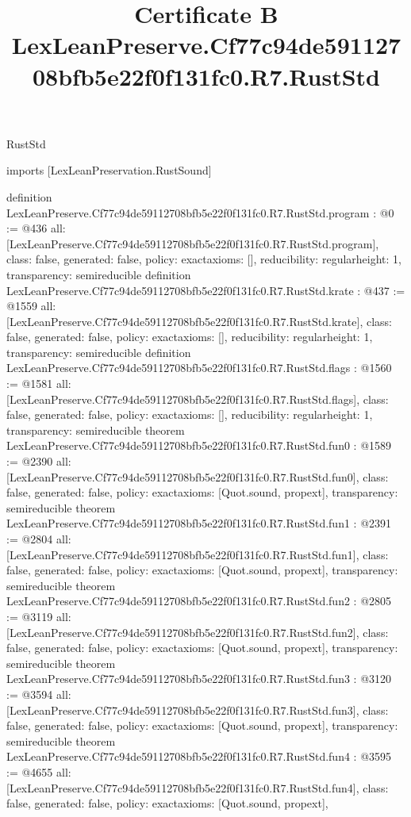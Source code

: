\begin{lexlean}{RustStd}
\title{Certificate B LexLeanPreserve.Cf77c94de59112708bfb5e22f0f131fc0.R7.RustStd}
\begin{coremodule}
imports [LexLeanPreservation.RustSound]

definition LexLeanPreserve.Cf77c94de59112708bfb5e22f0f131fc0.R7.RustStd.program : @0 := @436 {
  all: [LexLeanPreserve.Cf77c94de59112708bfb5e22f0f131fc0.R7.RustStd.program],
  class: false,
  generated: false,
  policy: exact{axioms: []},
  reducibility: regular{height: 1},
  transparency: semireducible
}
definition LexLeanPreserve.Cf77c94de59112708bfb5e22f0f131fc0.R7.RustStd.krate : @437 := @1559 {
  all: [LexLeanPreserve.Cf77c94de59112708bfb5e22f0f131fc0.R7.RustStd.krate],
  class: false,
  generated: false,
  policy: exact{axioms: []},
  reducibility: regular{height: 1},
  transparency: semireducible
}
definition LexLeanPreserve.Cf77c94de59112708bfb5e22f0f131fc0.R7.RustStd.flags : @1560 := @1581 {
  all: [LexLeanPreserve.Cf77c94de59112708bfb5e22f0f131fc0.R7.RustStd.flags],
  class: false,
  generated: false,
  policy: exact{axioms: []},
  reducibility: regular{height: 1},
  transparency: semireducible
}
theorem LexLeanPreserve.Cf77c94de59112708bfb5e22f0f131fc0.R7.RustStd.fun0 : @1589 := @2390 {
  all: [LexLeanPreserve.Cf77c94de59112708bfb5e22f0f131fc0.R7.RustStd.fun0],
  class: false,
  generated: false,
  policy: exact{axioms: [Quot.sound, propext]},
  transparency: semireducible
}
theorem LexLeanPreserve.Cf77c94de59112708bfb5e22f0f131fc0.R7.RustStd.fun1 : @2391 := @2804 {
  all: [LexLeanPreserve.Cf77c94de59112708bfb5e22f0f131fc0.R7.RustStd.fun1],
  class: false,
  generated: false,
  policy: exact{axioms: [Quot.sound, propext]},
  transparency: semireducible
}
theorem LexLeanPreserve.Cf77c94de59112708bfb5e22f0f131fc0.R7.RustStd.fun2 : @2805 := @3119 {
  all: [LexLeanPreserve.Cf77c94de59112708bfb5e22f0f131fc0.R7.RustStd.fun2],
  class: false,
  generated: false,
  policy: exact{axioms: [Quot.sound, propext]},
  transparency: semireducible
}
theorem LexLeanPreserve.Cf77c94de59112708bfb5e22f0f131fc0.R7.RustStd.fun3 : @3120 := @3594 {
  all: [LexLeanPreserve.Cf77c94de59112708bfb5e22f0f131fc0.R7.RustStd.fun3],
  class: false,
  generated: false,
  policy: exact{axioms: [Quot.sound, propext]},
  transparency: semireducible
}
theorem LexLeanPreserve.Cf77c94de59112708bfb5e22f0f131fc0.R7.RustStd.fun4 : @3595 := @4655 {
  all: [LexLeanPreserve.Cf77c94de59112708bfb5e22f0f131fc0.R7.RustStd.fun4],
  class: false,
  generated: false,
  policy: exact{axioms: [Quot.sound, propext]},
}
\end{coremodule}
\end{lexlean}
